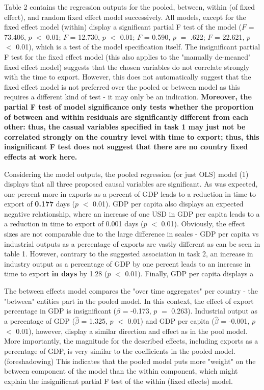 \documentclass[a4paper]{article}
\begin{document}
Table 2 contains the regression outputs for the pooled, between, within (of fixed effect), and random fixed effect model successively. All models, except for the fixed effect model (within) display a significant partial F test of the model ($F$ = 73.406, $p$ $<$ 0.01; $F$ = 12.730, $p$ $<$ 0.01; $F$ = 0.590, $p$ $=$ .622; $F$ = 22.621, $p$ $<$ 0.01), which is a test of the model specification itself.
The insignificant partial F test for the fixed effect model (this also applies to the "manually de-meaned" fixed effect model) suggests that the chosen variables do not correlate strongly with the time to export. However, this does not automatically suggest that the fixed effect model is not preferred over the pooled or between model as this requires a different kind of test - it may only be an indication. \textbf{Moreover, the partial F test of model significance only tests whether the proportion of between and within residuals are significantly different from each other: thus, the casual variables specified in task 1 may just not be correlated strongly on the country level with time to export; thus, this insignificant F test does not suggest that there are no country fixed effects at work here. }

Considering the model outputs, the pooled regression (or just OLS) model (1) displays that all three proposed causal variables are significant. As was expected, one percent more in exports as a percent of GDP leads to a reduction in time to export of \textbf{0.177} days ($p$ $<$ 0.01). GDP per capita also displays an expected negative relationship, where an increase of one USD in GDP per capita leads to a a reduction in time to export of 0.001 days ($p$ $<$ 0.01). Obviously, the effect sizes are not comparable due to the large difference in scales - GDP per capita vs industrial outputs as a percentage of exports are vastly different as can be seen in table 1.
However, contrary to the suggested association in task 2, an increase in industry output as a percentage of GDP by one percent leads to an increase in time to export \textbf{in days} by 1.28 ($p$ $<$ 0.01). Finally, GDP per capita displays a 

The between effects model compares the "over time aggregates" per country - the "between" entities part in the pooled model. In this context, the effect of export percentage in GDP is insignificant ($\hat{\beta}$ = -0.173, $p$ $=$ 0.263). Industrial output as a percentage of GDP ($\hat{\beta}$ = 1.325, $p$ $<$ 0.01) and GDP per capita ($\hat{\beta}$ = -0.001, $p$ $<$ 0.01), however, display a similar direction and effect as in the pool model. More importantly, the magnitude for the described effects, including exports as a percentage of GDP, is very similar to the coefficients in the pooled model. (foreshadowing) This indicates that the pooled model puts more "weight" on the between component of the model than the within component, which might explain the insignificant partial F test of the within (fixed effects) model. 
\end{document}
